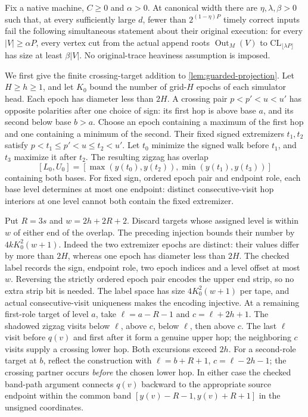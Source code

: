 \begin{theorem}\label{thm:original-crossing-expansion}
Fix a native machine, $C\ge0$ and $\alpha>0$.
At canonical width there are $\eta,\lambda,\beta>0$ such that, at every
sufficiently large $d$, fewer than $2^{(1-\eta)P}$ timely correct inputs fail
the following simultaneous statement about their original execution:
for every $|V|\ge\alpha P$, every vertex cut from the actual append roots
$\operatorname{Out}_M(V)$ to $\mathrm{CL}_{\lfloor\lambda P\rfloor}$ has
size at least $\beta|V|$. No original-trace heaviness assumption is imposed.
\end{theorem}
\begin{outline}
We first give the finite crossing-target addition to
\cref{lem:guarded-projection}. Let $H\ge h\ge1$, and let $K_0$ bound the
number of grid-$H$ epochs of each simulator head. Each epoch has diameter
less than $2H$. A crossing pair $p<p'<u<u'$ has opposite polarities after
one choice of sign: its first hop is above base $a$, and its second below
base $b>a$. Choose an epoch containing a maximum of the first hop and one
containing a minimum of the second. Their fixed signed extremizers $t_1,t_2$
satisfy $p<t_1\le p'<u\le t_2<u'$. Let $t_0$ minimize the signed walk before
$t_1$, and $t_3$ maximize it after $t_2$. The resulting zigzag has overlap
\[
 [L_0,U_0]=[\max(y(t_0),y(t_2)),\min(y(t_1),y(t_3))]
\]
containing both bases. For fixed sign, ordered epoch pair and endpoint role,
each base level determines at most one endpoint: distinct consecutive-visit
hop interiors at one level cannot both contain the fixed extremizer.

Put $R=3s$ and $w=2h+2R+2$. Discard targets whose assigned level is within
$w$ of either end of the overlap. The preceding injection bounds their number
by $4kK_0^2(w+1)$. Indeed the two extremizer epochs are distinct: their
values differ by more than $2H$, whereas one epoch has diameter less than
$2H$. The checked label records the sign, endpoint role, two epoch indices
and a level offset at most $w$. Reversing the strictly ordered epoch pair
encodes the upper end strip, so no extra strip bit is needed. The label
space has size $4K_0^2(w+1)$ per tape, and actual consecutive-visit
uniqueness makes the encoding injective.
At a remaining first-role target of level $a$, take
$\ell=a-R-1$ and $c=\ell+2h+1$. The shadowed zigzag visits below $\ell$,
above $c$, below $\ell$, then above $c$. The last $\ell$ visit before
$q(v)$ and first after it form a genuine upper hop; the neighboring $c$ visits
supply a crossing lower hop. Both excursions exceed $2h$.
For a second-role target at $b$, reflect the construction with
$\ell=b+R+1$, $c=\ell-2h-1$; the crossing partner occurs \emph{before} the
chosen lower hop. In either case the checked band-path argument connects
$q(v)$ backward to the appropriate source endpoint within the common band
$[y(v)-R-1,y(v)+R+1]$ in the unsigned coordinates.


\end{outline}
